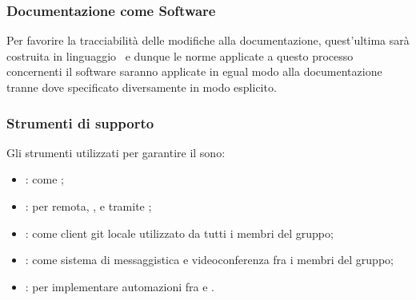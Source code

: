 \documentclass[]{article}
\begin{document}
			\subsubsection{Documentazione come Software}
			Per favorire la tracciabilità delle modifiche alla documentazione, quest'ultima sarà costruita in linguaggio \glock{\LaTeX}\ e dunque le norme applicate a questo processo concernenti il software saranno applicate in egual modo alla documentazione tranne dove specificato diversamente in modo esplicito.

			\subsubsection{Strumenti di supporto}
			Gli strumenti utilizzati per garantire il  sono:
			\begin{itemize}
				\item \textbf{}: come ;
				\item \textbf{}: per  remota, ,  e  tramite ;
				\item \textbf{}: come client git locale utilizzato da tutti i membri del gruppo;
				\item \textbf{}: come sistema di messaggistica e videoconferenza fra i membri del gruppo;
				\item \textbf{}: per implementare automazioni fra  e .
			\end{itemize}
\end{document}
